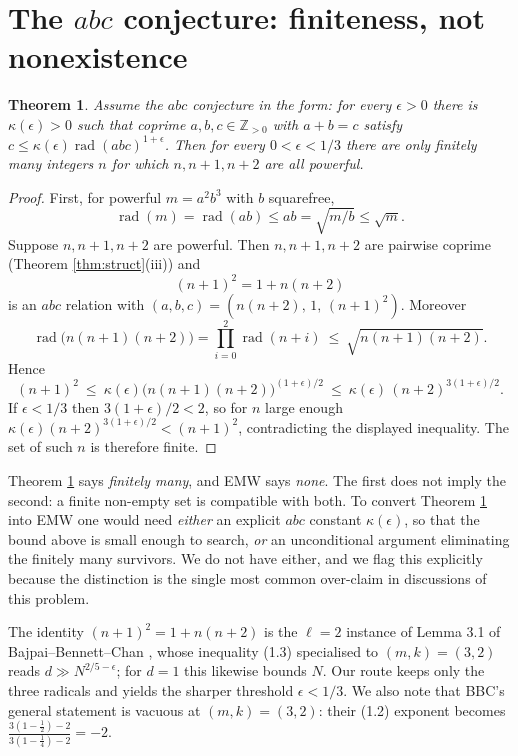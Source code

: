 \documentclass[11pt]{article}
\newtheorem{theorem}{Theorem}[section]
\theoremstyle{definition}
\begin{document}
\section{The $abc$ conjecture: finiteness, not nonexistence}\label{sec:abc}

\begin{theorem}\label{thm:abc}
Assume the $abc$ conjecture in the form: for every $\epsilon>0$ there is
$\kappa(\epsilon)>0$ such that coprime $a,b,c\in\mathbb Z_{>0}$ with $a+b=c$ satisfy
$c\le\kappa(\epsilon)\operatorname{rad}(abc)^{1+\epsilon}$. Then for every
$0<\epsilon<1/3$ there are only \emph{finitely many} integers $n$ for which
$n,n+1,n+2$ are all powerful.
\end{theorem}

\begin{proof}
First, for powerful $m=a^2b^3$ with $b$ squarefree,
\[ \operatorname{rad}(m)=\operatorname{rad}(ab)\le ab=\sqrt{m/b}\le\sqrt m .\]
Suppose $n,n+1,n+2$ are powerful. Then $n,n+1,n+2$ are pairwise coprime (Theorem
\ref{thm:struct}(iii)) and
\[(n+1)^2=1+n(n+2)\]
is an $abc$ relation with $(a,b,c)=(n(n+2),\,1,\,(n+1)^2)$. Moreover
\[ \operatorname{rad}\big(n(n+1)(n+2)\big)
=\prod_{i=0}^{2}\operatorname{rad}(n+i)\ \le\ \sqrt{n(n+1)(n+2)} .\]
Hence
\[(n+1)^2\ \le\ \kappa(\epsilon)\big(n(n+1)(n+2)\big)^{(1+\epsilon)/2}
\ \le\ \kappa(\epsilon)\,(n+2)^{3(1+\epsilon)/2}.\]
If $\epsilon<1/3$ then $3(1+\epsilon)/2<2$, so for $n$ large enough
$\kappa(\epsilon)(n+2)^{3(1+\epsilon)/2}<(n+1)^2$, contradicting the displayed
inequality. The set of such $n$ is therefore finite.
\end{proof}

\begin{remark}\label{rem:abc-not-enough}
Theorem \ref{thm:abc} says \emph{finitely many}, and EMW says \emph{none}. The
first does not imply the second: a finite non-empty set is compatible with both.
To convert Theorem \ref{thm:abc} into EMW one would need \emph{either} an explicit
$abc$ constant $\kappa(\epsilon)$, so that the bound above is small enough to search,
\emph{or} an unconditional argument eliminating the finitely many survivors. We do
not have either, and we flag this explicitly because the distinction is the single
most common over-claim in discussions of this problem.
\end{remark}

The identity $(n+1)^2=1+n(n+2)$ is the $\ell=2$ instance of Lemma 3.1 of
Bajpai--Bennett--Chan \cite{bajpai2024}, whose inequality (1.3) specialised to
$(m,k)=(3,2)$ reads $d\gg N^{2/5-\epsilon}$; for $d=1$ this likewise bounds $N$. Our
route keeps only the three radicals and yields the sharper threshold
$\epsilon<1/3$. We also note that BBC's general statement is vacuous at $(m,k)=(3,2)$:
their (1.2) exponent becomes $\frac{3(1-\frac12)-2}{3(1-\frac14)-2}=-2$.
\end{document}
